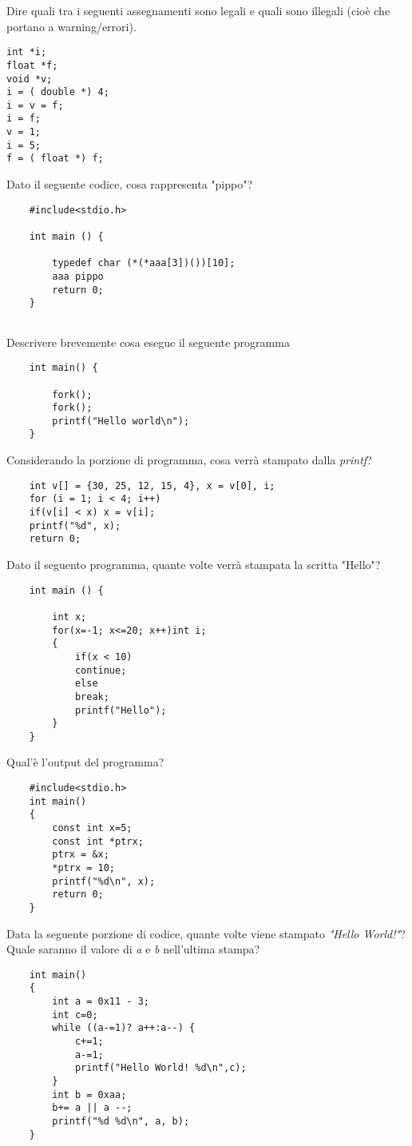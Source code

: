 \documentclass[a4paper,12pt] {exam}
\begin{document}
\begin{questions}
\question {} Dire quali tra i seguenti assegnamenti sono legali e quali sono illegali (cioè che portano a warning/errori).
\begin{lstlisting}
int *i;
float *f;
void *v;
i = ( double *) 4;
i = v = f;
i = f;
v = 1;
i = 5;
f = ( float *) f;
\end{lstlisting}

\question {} Dato il seguente codice, cosa rappresenta "pippo"?
\begin{lstlisting}
	#include<stdio.h>
	
	int main () {
		
		typedef char (*(*aaa[3])())[10];
		aaa pippo
		return 0;
	}
	
\end{lstlisting}
\pagebreak[5]
\question {} Descrivere brevemente cosa esegue il seguente programma
\begin{lstlisting}
	int main() {		
		
		fork();
		fork();
		printf("Hello world\n");
	}
\end{lstlisting}

\question {} Considerando la porzione di programma, cosa verrà stampato dalla \textit{printf}?

\begin{lstlisting}
	int v[] = {30, 25, 12, 15, 4}, x = v[0], i;
	for (i = 1; i < 4; i++)
	if(v[i] < x) x = v[i];
	printf("%d", x);
	return 0;
\end{lstlisting}

\question {} Dato il seguento programma, quante volte verrà stampata la scritta "Hello"?
\begin{lstlisting}
	int main () {
		
		int x;		
		for(x=-1; x<=20; x++)int i;
		{
			if(x < 10)
			continue;
			else
			break;
			printf("Hello");
		}
	}
\end{lstlisting}
\pagebreak
\question {} Qual'è l'output del programma?
\begin{lstlisting}
	#include<stdio.h>
	int main()
	{
		const int x=5;
		const int *ptrx;
		ptrx = &x;
		*ptrx = 10;
		printf("%d\n", x);
		return 0;
	}
\end{lstlisting}
\pagebreak[5]
\question {} Data la seguente porzione di codice, quante volte viene stampato \textit{"Hello World!"}? Quale saranno il valore di \textit{a} e \textit{b} nell'ultima stampa?
\begin{lstlisting}
	int main()
	{
		int a = 0x11 - 3;
		int c=0;
		while ((a-=1)? a++:a--) {
			c+=1;
			a-=1;
			printf("Hello World! %d\n",c);
		}
		int b = 0xaa;
		b+= a || a --;
		printf("%d %d\n", a, b);
	}
\end{lstlisting}


\end{questions}
\end{document}
